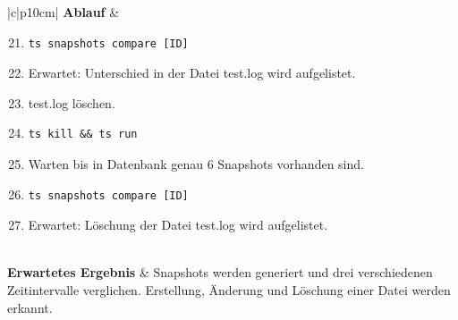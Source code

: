 \documentclass[a4paper,12pt]{report}
\begin{document}
    \begin{table}[h!]
        \centering
        \setlength{\leftmargini}{0.8cm}
        \begin{tabular}{|c|p{10cm}|}
            \hline
            \textbf{Ablauf} &
            \begin{enumerate}
                \setcounter{enumi}{20}
                \item \begin{verbatim}ts snapshots compare [ID]
                \end{verbatim}
                \item Erwartet: Unterschied in der Datei test.log wird aufgelistet.
                \item test.log löschen.
                \item \begin{verbatim}ts kill && ts run
                \end{verbatim}
                \item Warten bis in Datenbank genau 6 Snapshots vorhanden sind.
                \item \begin{verbatim}ts snapshots compare [ID]
                \end{verbatim}
                \item Erwartet: Löschung der Datei test.log wird aufgelistet.
            \end{enumerate} \\ \hline
            \textbf{Erwartetes Ergebnis} & Snapshots werden generiert und drei verschiedenen Zeitintervalle verglichen.
            Erstellung, Änderung und Löschung einer Datei werden erkannt. \\ \hline
        \end{tabular}
        \caption{Manueller End-2-End Test E2E-007}\label{tab:e2e-7.2}
    \end{table}

    \clearpage
\end{document}
